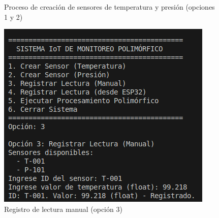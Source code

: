\documentclass[conference]{IEEEtran}
\begin{document}
\begin{figure}[h]
    \centering
    \hfill
    \caption{Proceso de creación de sensores de temperatura y presión (opciones 1 y 2)}
    \label{fig:creacion}
\end{figure}

\begin{figure}[h]
    \centering
    \includegraphics[width=\RelacionFiguradoscolumnas\columnwidth]{registrar_lectura_manual.png}
    \caption{Registro de lectura manual (opción 3)}
    \label{fig:lectura_manual}
\end{figure}
\end{document}
